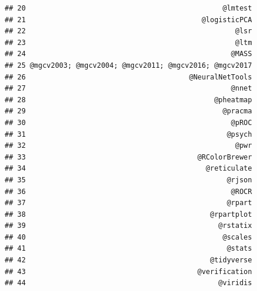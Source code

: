 \documentclass[a4paper, nobind]{templates/ociamthesis}
\begin{document}
\begin{verbatim}
## 20                                               @lmtest
## 21                                          @logisticPCA
## 22                                                  @lsr
## 23                                                  @ltm
## 24                                                 @MASS
## 25 @mgcv2003; @mgcv2004; @mgcv2011; @mgcv2016; @mgcv2017
## 26                                       @NeuralNetTools
## 27                                                 @nnet
## 28                                             @pheatmap
## 29                                               @pracma
## 30                                                 @pROC
## 31                                                @psych
## 32                                                  @pwr
## 33                                         @RColorBrewer
## 34                                           @reticulate
## 35                                                @rjson
## 36                                                 @ROCR
## 37                                                @rpart
## 38                                            @rpartplot
## 39                                              @rstatix
## 40                                               @scales
## 41                                                @stats
## 42                                            @tidyverse
## 43                                         @verification
## 44                                              @viridis
\end{verbatim}
\end{document}
